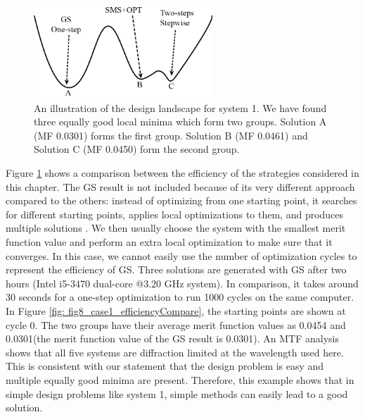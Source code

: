 \begin{figure}[h!]
    \centering
    \includegraphics[width=0.6\textwidth]{chapter-5/figures/Fig7_Landscape_illustration_sys1-2.png}
    \caption{An illustration of the design landscape for system 1. We have found three equally good local minima which form two groups. Solution A (MF 0.0301) forms the first group. Solution B (MF 0.0461) and Solution C (MF 0.0450) form the second group.}
    \label{fig: fig7_landscape_illus}
\end{figure}


Figure \ref{fig: fig7_landscape_illus} shows a comparison between the efficiency of the strategies considered in this chapter. The GS result is not included because of its very different approach compared to the others: instead of optimizing from one starting point, it searches for different starting points, applies local optimizations to them, and produces multiple solutions \cite{codevmanual}. We then usually choose the system with the smallest merit function value and perform an extra local optimization to make sure that it converges. In this case, we cannot easily use the number of optimization cycles to represent the efficiency of GS. Three solutions are generated with GS after two hours (Intel i5-3470 dual-core @3.20 GHz system). In comparison, it takes around 30 seconds for a one-step optimization to run 1000 cycles on the same computer. In Figure \ref{fig: fig8_case1_efficiencyCompare}, the starting points are shown at cycle 0. The two groups have their average merit function values as 0.0454 and 0.0301(the merit function value of the GS result is 0.0301). An MTF analysis shows that all five systems are diffraction limited at the wavelength used here. This is consistent with our statement that the design problem is easy and multiple equally good minima are present. Therefore, this example shows that in simple design problems like system 1, simple methods can easily lead to a good solution. 


